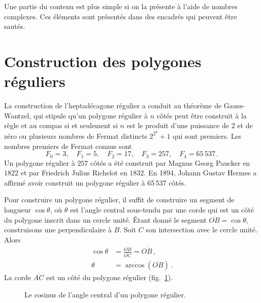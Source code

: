 Une partie du contenu est plus simple si on  la présente à l'aide de nombres complexes. Ces éléments sont présentés dans des encadrés qui peuvent être sautés.



\section{Construction des polygones réguliers}\label{s.hept-regular}

La construction de l'heptadécagone régulier a conduit au théorème de Gauss-Wantzel, qui stipule qu'un polygone régulier à $n$ côtés peut être construit à la règle et au  compas si et seulement si $n$ est le produit d'une puissance de $2$ et de zéro ou plusieurs nombres de Fermat distincts $2^{2^k}+1$ qui sont premiers. Les nombres premiers de Fermat connus sont 
\[
F_0=3,\quad F_1=5,\quad F_2=17,\quad F_3=257,\quad F_4=65\,537\,.
\]
Un polygone régulier à $257$ côtés a été construit par Magnus Georg Paucker en $1822$ et par Friedrich Julius Richelot en $1832$. En 1894, Johann Gustav Hermes a affirmé avoir construit un polygone régulier à 65\,537 côtés.

Pour construire un polygone régulier, il suffit de construire un segment  de longueur $\cos \theta$, où $\theta$ est l'angle central sous-tendu par une corde qui est un côté du polygone inscrit dans un cercle unité. Étant donné le segment $\overline{OB}=\cos\theta$, construisons une perpendiculaire à $B$. Soit $C$ son intersection avec le cercle unité. Alors 
\begin{align*}
\cos \theta&=\displaystyle\frac{\overline{OB}}{\overline{OC}}=\overline{OB}\,,\\
\theta &= \arccos (\overline{OB})\,.
\end{align*}
La corde $\overline{AC}$ est un côté du polygone régulier  (fig.~\ref{f.hept-central1}).

\begin{figure}[htbp]
\centering
{}
\caption{Le cosinus de l'angle central d'un polygone régulier.}\label{f.hept-central1}
\end{figure}

